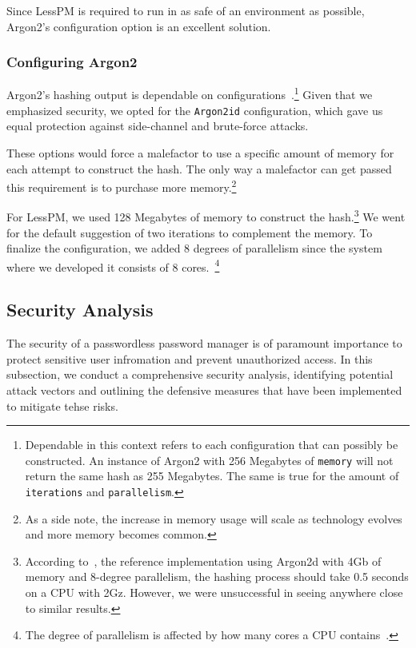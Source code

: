 Since LessPM is required to run in as safe of an environment as possible,
Argon2's configuration option is an excellent solution.

\subsubsection{Configuring Argon2}
Argon2's hashing output is dependable on
configurations~\cite{argon2specs}.\footnote{
  Dependable in this context refers to each configuration that can
  possibly be constructed.
  An instance of Argon2 with 256 Megabytes of \texttt{memory} will not return
  the same hash as 255 Megabytes.
  The same is true for the amount of \texttt{iterations} and
  \texttt{parallelism}.
}
Given that we emphasized security, we opted for the \texttt{Argon2id}
configuration, which gave us equal protection against side-channel and
brute-force attacks.

These options would force a malefactor to use a specific amount of memory for
each attempt to construct the hash.
The only way a malefactor can get passed this requirement is to purchase more
memory.\footnote{
  As a side note, the increase in memory usage will scale as technology evolves
  and more memory becomes common.
}

For LessPM, we used 128 Megabytes of memory to construct the hash.\footnote{
  According to~\cite{argon2specs}, the reference implementation using Argon2d
  with 4Gb of memory and 8-degree parallelism, the hashing process should take
  0.5 seconds on a CPU with 2Gz. However, we were unsuccessful in seeing
  anywhere close to similar results.
}
We went for the default suggestion of two iterations to complement the memory.
To finalize the configuration, we added 8 degrees of parallelism since the
system where we developed it consists of 8 cores.~\footnote{
  The degree of parallelism is affected by how many cores a CPU
  contains~\cite{argon2specs}.
}


\subsection{Security Analysis}\label{subsec:security-analysis}
The security of a passwordless password manager is of paramount importance to
protect sensitive user infromation and prevent unauthorized access.
In this subsection, we conduct a comprehensive security analysis, identifying
  potential attack vectors and outlining the defensive measures that have
  been implemented to mitigate tehse risks.

